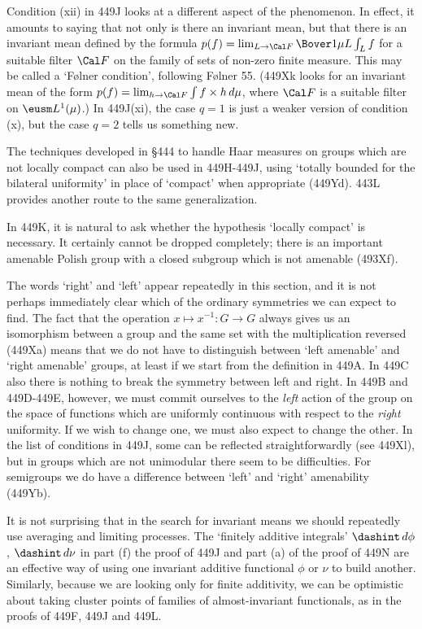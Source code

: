 {Condition (xii) in 449J looks at a different aspect of the
phenomenon.   In effect, it amounts to saying that not only is there
an invariant mean, but that there is an invariant mean defined by the
formula $p(f)=\lim_{L\to\Cal F}\Bover1{\mu L}\int_Lf$ for a suitable
filter $\Cal F$ on the family of sets of non-zero finite measure.
This may be called a `F{\o}lner condition', following
{\smc F{\o}lner 55}.   (449Xk looks for an invariant mean of
the form $p(f)=\lim_{h\to\Cal F}\int f\times h\,d\mu$, where $\Cal F$
is a suitable filter on $\eusm L^1(\mu)$.)   In 449J(xi), the case $q=1$
is just a weaker version of condition (x), but the case $q=2$ tells us
something new.

The techniques developed in \S444 to handle Haar measures on groups
which are not locally compact can also be used in 449H-449J, using
`totally bounded for the bilateral uniformity' in place of `compact'
when appropriate (449Yd).   443L provides another route to the same
generalization.

In 449K, it is natural to ask whether the hypothesis `locally compact' is
necessary.   It certainly cannot be dropped completely;  there is an
important
amenable Polish group with a closed subgroup which is not amenable
(493Xf).

The words `right' and `left' appear repeatedly in this section, and it
is not perhaps immediately clear which of the ordinary symmetries we can
expect to find.   The fact that the operation $x\mapsto x^{-1}:G\to G$
always gives us an isomorphism between a group and the same set with the
multiplication reversed (449Xa) means that we do not have to distinguish
between `left amenable' and `right amenable' groups, at least if we
start from the definition in 449A.   In 449C also there is nothing to
break the symmetry between left and right.   In 449B and 449D-449E,
however, we must commit ourselves to the {\it left} action of the group
on the space of functions which are uniformly continuous with respect to
the {\it right} uniformity.   If we wish to change one, we must also
expect to change the other.   In the list of conditions
in 449J, some can be reflected straightforwardly (see 449Xl),
but in groups which are not unimodular there seem to be difficulties.
For semigroups we do have a difference
between `left' and `right' amenability (449Yb).

It is not surprising that in the search for invariant means we should
repeatedly use averaging and limiting processes.   The
`finitely additive integrals' $\dashint\,d\phi$, $\dashint\,d\nu$
in part (f) the proof of 449J and part (a) of the proof of 449N
are an effective way of using one
invariant additive functional $\phi$ or $\nu$ to build another.
Similarly, because we are looking only for finite additivity,
we can be optimistic about taking cluster
points of families of almost-invariant functionals, as in the proofs of
449F, 449J and 449L.

}
